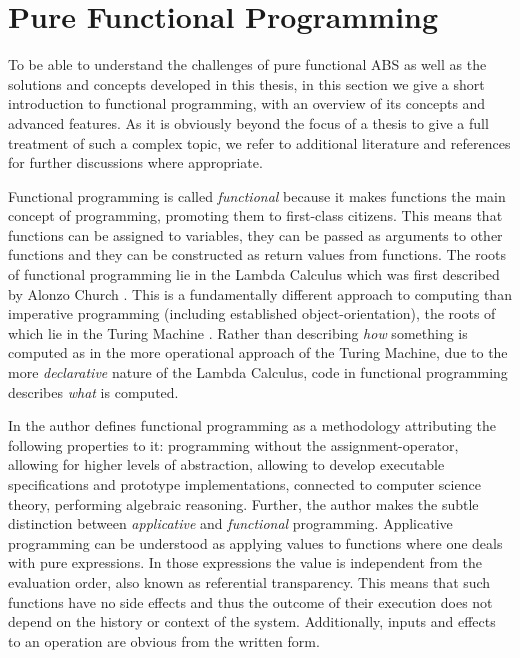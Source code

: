 \section{Pure Functional Programming}
\label{sec:background_fp}
To be able to understand the challenges of pure functional ABS as well as the solutions and concepts developed in this thesis, in this section we give a short introduction to functional programming, with an overview of its concepts and advanced features. As it is obviously beyond the focus of a thesis to give a full treatment of such a complex topic, we refer to additional literature and references for further discussions where appropriate.

Functional programming is called \textit{functional} because it makes functions the main concept of programming, promoting them to first-class citizens. This means that functions can be assigned to variables, they can be passed as arguments to other functions and they can be constructed as return values from functions. The roots of functional programming lie in the Lambda Calculus which was first described by Alonzo Church \cite{church_unsolvable_1936}. This is a fundamentally different approach to computing than imperative programming (including established object-orientation), the roots of which lie in the Turing Machine \cite{turing_computable_1937}. Rather than describing \textit{how} something is computed as in the more operational approach of the Turing Machine, due to the more \textit{declarative} nature of the Lambda Calculus, code in functional programming describes \textit{what} is computed.

In \cite{maclennan_functional_1990} the author defines functional programming as a methodology attributing the following properties to it: programming without the assignment-operator, allowing for higher levels of abstraction, allowing to develop executable specifications and prototype implementations, connected to computer science theory, performing algebraic reasoning. Further, the author makes the subtle distinction between \textit{applicative} and \textit{functional} programming. Applicative programming can be understood as applying values to functions where one deals with pure expressions. In those expressions the value is independent from the evaluation order, also known as referential transparency. This means that such functions have no side effects and thus the outcome of their execution does not depend on the history or context of the system. Additionally, inputs and effects to an operation are obvious from the written form.


